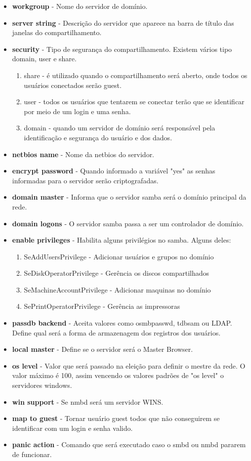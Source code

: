 \begin{itemize}
	\item \textbf{workgroup} - Nome do servidor de domínio.
	\item \textbf{server string} - Descrição do servidor que aparece na barra de título das janelas do compartilhamento.
	\item \textbf{security} - Tipo de segurança do compartilhamento. Existem vários tipo domain, user e share.
		\begin{enumerate}
			\item {share}  - é utilizado quando o compartilhamento será aberto, onde todos os usuários conectados serão guest.
			\item {user} - todos os usuários que tentarem se conectar terão que se identificar por meio de um login e uma senha.
			\item {domain} - quando um servidor de domínio será responsável pela identificação e segurança do usuário e dos dados.
		\end{enumerate} 
	\item \textbf{netbios name} - Nome da netbios do servidor.
	\item \textbf{encrypt password} - Quando informado a variável "yes" as senhas informadas para o servidor serão criptografadas.
	\item \textbf{domain master} - Informa que o servidor samba será o domínio principal da rede.
	\item \textbf{domain logons} - O servidor samba passa a ser um controlador de domínio.
	\item \textbf{enable privileges} - Habilita alguns privilégios no samba. Alguns deles:
		\begin{enumerate}
			\item {SeAddUsersPrivilege} - Adicionar usuários e grupos no domínio 
			\item {SeDiskOperatorPrivilege} - Gerência os discos compartilhados 
			\item {SeMachineAccountPrivilege} - Adicionar maquinas no domínio 
			\item {SePrintOperatorPrivilege} - Gerência as impressoras
		\end{enumerate}
	\item \textbf{passdb backend} - Aceita valores como osmbpasswd, tdbsam ou LDAP. Define qual será a forma de armazenagem dos registros dos usuários.
	\item \textbf{local master} - Define se o servidor será o Master Browser.
	\item \textbf{os level} - Valor que será passado na eleição para definir o mestre da rede. O valor máximo é 100, assim vencendo os valores padrões de "os level" o servidores windows.
	\item \textbf{win support} - Se nmbd será um servidor WINS.
	\item \textbf{map to guest} - Tornar usuário guest todos que não conseguirem se identificar com um login e senha valido.
	\item \textbf{panic action} - Comando que será executado caso o smbd ou nmbd pararem de funcionar.
\end{itemize}

